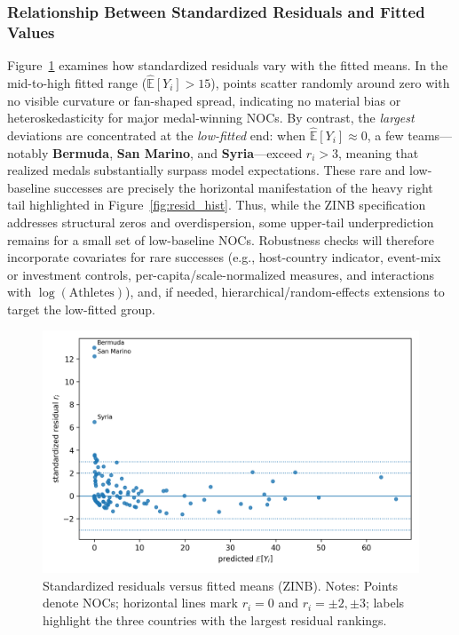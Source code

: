 \documentclass[11pt,twoside]{article}
\numberwithin{Theorem}{section}
\numberwithin{Definition}{section}
\numberwithin{Lemma}{section}
\numberwithin{Algorithm}{section}
\numberwithin{equation}{section}
\begin{document}
\subsubsection{Relationship Between Standardized Residuals and Fitted Values}

Figure~\ref{fig:resid_vs_pred} examines how standardized residuals vary with the 
fitted means. In the mid-to-high fitted range ($\widehat{\mathbb{E}}[Y_i]>15$), 
points scatter randomly around zero with no visible curvature or fan-shaped spread, 
indicating no material bias or heteroskedasticity for major medal-winning NOCs. 
By contrast, the \emph{largest} deviations are concentrated at the \emph{low-fitted} 
end: when $\widehat{\mathbb{E}}[Y_i]\approx 0$, a few teams---notably 
\textbf{Bermuda}, \textbf{San Marino}, and \textbf{Syria}---exceed $r_i>3$, 
meaning that realized medals substantially surpass model expectations. 
These rare and low-baseline successes are precisely the horizontal manifestation
of the heavy right tail highlighted in Figure~\ref{fig:resid_hist}. 
Thus, while the ZINB specification addresses structural zeros and overdispersion, 
some upper-tail underprediction remains for a small set of low-baseline NOCs. 
Robustness checks will therefore incorporate covariates for rare successes 
(e.g., host-country indicator, event-mix or investment controls, per-capita/scale-normalized 
measures, and interactions with $\log(\mathrm{Athletes})$), and, if needed, 
hierarchical/random-effects extensions to target the low-fitted group.

\begin{figure}[H]
  \centering
  \includegraphics[width=0.92\linewidth]{fig_resid_vs_pred.png}
  \caption{Standardized residuals versus fitted means (ZINB).
  Notes: Points denote NOCs; horizontal lines mark $r_i=0$ and $r_i=\pm2,\pm3$; labels highlight the three countries with the largest residual rankings.}
  \label{fig:resid_vs_pred}
\end{figure}
\end{document}
